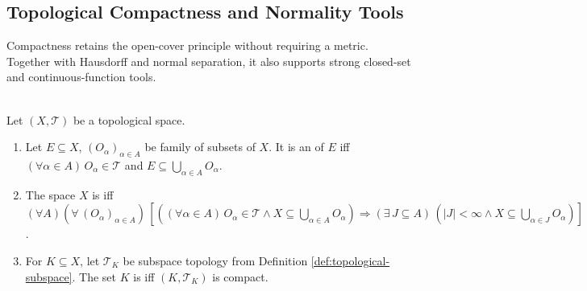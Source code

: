 \subsection{Topological Compactness and Normality Tools}

Compactness retains the open-cover principle without requiring a metric.\\
Together with Hausdorff and normal separation, it also supports strong closed-set and continuous-function tools.

\begin{definition} \label{def:topological-compactness} \\
Let $(X,\mathcal{T})$ be a topological space.
\begin{enumerate}[label=(\roman*)]
\setlength{\itemsep}{0pt}
\item Let $E\subseteq X$, $(O_\alpha)_{\alpha\in A}$ be family of subsets of $X$. It is an  of $E$ iff $(\forall\alpha\in A)\,O_\alpha\in\mathcal{T}$ and $E\subseteq\bigcup\limits_{\alpha\in A}O_\alpha$.
\item The space $X$ is  iff $(\forall A)(\forall\,(O_\alpha)_{\alpha\in A})\,[((\forall\alpha\in A)\,O_\alpha\in\mathcal{T}\land X\subseteq\bigcup\limits_{\alpha\in A}O_\alpha)\Longrightarrow(\exists\,J\subseteq A)\,(|J|<\infty\land X\subseteq\bigcup\limits_{\alpha\in J}O_\alpha)]$.
\item For $K\subseteq X$, let $\mathcal{T}_K$ be subspace topology from Definition \ref{def:topological-subspace}. The set $K$ is  iff $(K,\mathcal{T}_K)$ is compact.
\end{enumerate}
\end{definition}

